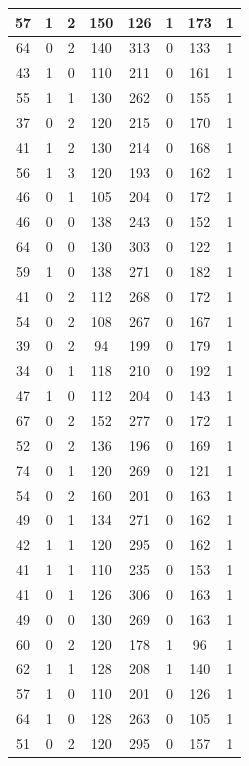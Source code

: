 \documentclass{article}
\begin{document}
\begin{longtable}{|c|c|c|c|c|c|c|c|}
\hline
57 & 1 & 2 & 150 & 126 & 1 & 173 & 1 \\
\hline
64 & 0 & 2 & 140 & 313 & 0 & 133 & 1 \\
\hline
43 & 1 & 0 & 110 & 211 & 0 & 161 & 1 \\
\hline
55 & 1 & 1 & 130 & 262 & 0 & 155 & 1 \\
\hline
37 & 0 & 2 & 120 & 215 & 0 & 170 & 1 \\
\hline
41 & 1 & 2 & 130 & 214 & 0 & 168 & 1 \\
\hline
56 & 1 & 3 & 120 & 193 & 0 & 162 & 1 \\
\hline
46 & 0 & 1 & 105 & 204 & 0 & 172 & 1 \\
\hline
46 & 0 & 0 & 138 & 243 & 0 & 152 & 1 \\
\hline
64 & 0 & 0 & 130 & 303 & 0 & 122 & 1 \\
\hline
59 & 1 & 0 & 138 & 271 & 0 & 182 & 1 \\
\hline
41 & 0 & 2 & 112 & 268 & 0 & 172 & 1 \\
\hline
54 & 0 & 2 & 108 & 267 & 0 & 167 & 1 \\
\hline
39 & 0 & 2 & 94 & 199 & 0 & 179 & 1 \\
\hline
34 & 0 & 1 & 118 & 210 & 0 & 192 & 1 \\
\hline
47 & 1 & 0 & 112 & 204 & 0 & 143 & 1 \\
\hline
67 & 0 & 2 & 152 & 277 & 0 & 172 & 1 \\
\hline
52 & 0 & 2 & 136 & 196 & 0 & 169 & 1 \\
\hline
74 & 0 & 1 & 120 & 269 & 0 & 121 & 1 \\
\hline
54 & 0 & 2 & 160 & 201 & 0 & 163 & 1 \\
\hline
49 & 0 & 1 & 134 & 271 & 0 & 162 & 1 \\
\hline
42 & 1 & 1 & 120 & 295 & 0 & 162 & 1 \\
\hline
41 & 1 & 1 & 110 & 235 & 0 & 153 & 1 \\
\hline
41 & 0 & 1 & 126 & 306 & 0 & 163 & 1 \\
\hline
49 & 0 & 0 & 130 & 269 & 0 & 163 & 1 \\
\hline
60 & 0 & 2 & 120 & 178 & 1 & 96 & 1 \\
\hline
62 & 1 & 1 & 128 & 208 & 1 & 140 & 1 \\
\hline
57 & 1 & 0 & 110 & 201 & 0 & 126 & 1 \\
\hline
64 & 1 & 0 & 128 & 263 & 0 & 105 & 1 \\
\hline
51 & 0 & 2 & 120 & 295 & 0 & 157 & 1 \\

\end{longtable}
\end{document}
